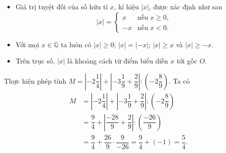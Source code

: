 \begin{dang}
\begin{itemize}
\item  Giá trị tuyệt đối của số hữu tỉ $x$, kí hiệu $|x|$, được xác định như sau $$|x|=\begin{cases}x&\text{nếu}\; x\ge 0,\\ -x&\text{nếu}\; x<0.\end{cases}$$
\item   Với mọi $x\in\mathbb{Q}$ ta luôn có $|x|\ge 0$; $|x|=|-x|$; $|x|\ge x$ và $|x|\ge -x$.
\item  Trên trục số, $|x|$ là khoảng cách từ điểm biểu diễn $x$ tới gốc $O$.
\end{itemize}
\end{dang}
\begin{vd}
Thực hiện phép tính $M=\left|-2\dfrac{1}{4}\right|+\left|-3\dfrac{1}{9}+\dfrac{2}{9}\right|:\left(-2\dfrac{8}{9}\right)$.
\loigiai
{
Ta có \begin{align*}
M&=\left|-2\dfrac{1}{4}\right|+\left|-3\dfrac{1}{9}+\dfrac{2}{9}\right|:\left(-2\dfrac{8}{9}\right)\\ 
&=\dfrac{9}{4}+\left|\dfrac{-28}{9}+\dfrac{2}{9}\right|:\left(\dfrac{-26}{9}\right)\\
&=\dfrac{9}{4}+\dfrac{26}{9}\cdot\dfrac{9}{-26}=\dfrac{9}{4}+(-1)=\dfrac{5}{4}.
\end{align*}
}
\end{vd}

